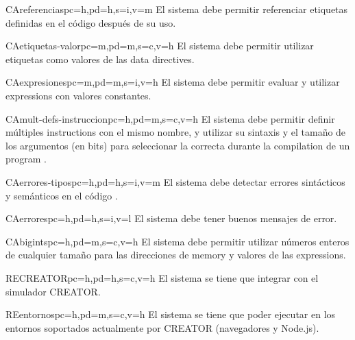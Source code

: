 \begin{userReq}{CA}{referencias}{pc=h,pd=h,s=i,v=m}
    El sistema debe permitir referenciar etiquetas definidas en el
    código  después de su uso.
\end{userReq}

\begin{userReq}{CA}{etiquetas-valor}{pc=m,pd=m,s=c,v=h}
    El sistema debe permitir utilizar etiquetas como valores de las \glspl{data directive}.
\end{userReq}

\begin{userReq}{CA}{expresiones}{pc=m,pd=m,s=i,v=h}
    El sistema debe permitir evaluar y utilizar \glspl{expression} con valores
    constantes.
\end{userReq}

\begin{userReq}{CA}{mult-defs-instruccion}{pc=h,pd=m,s=c,v=h}
    El sistema debe permitir definir múltiples \glspl{instruction} con el mismo
    nombre, y utilizar su sintaxis y el tamaño de los argumentos (en bits) para
    seleccionar la correcta durante la \gls{compilation} de un \gls{program}
    .
\end{userReq}

\begin{userReq}{CA}{errores-tipos}{pc=h,pd=h,s=i,v=m}
    El sistema debe detectar errores sintácticos y semánticos en el código
    .
\end{userReq}

\begin{userReq}{CA}{errores}{pc=h,pd=h,s=i,v=l}
    El sistema debe tener buenos mensajes de error.
\end{userReq}

\begin{userReq}{CA}{bigints}{pc=h,pd=m,s=c,v=h}
    El sistema debe permitir utilizar números enteros de cualquier tamaño para
    las direcciones de \gls{memory} y valores de las \glspl{expression}.
\end{userReq}


\begin{userReq}{RE}{CREATOR}{pc=h,pd=h,s=c,v=h}
    El sistema se tiene que integrar con el simulador CREATOR.
\end{userReq}

\begin{userReq}{RE}{entornos}{pc=h,pd=m,s=c,v=h}
    El sistema se tiene que poder ejecutar en los entornos soportados
    actualmente por CREATOR (navegadores y Node.js).
\end{userReq}

